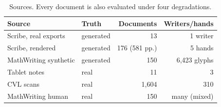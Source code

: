 \begin{table}[t]\centering\caption{Sources. Every document is also evaluated under four degradations.}\label{tab:data}
\footnotesize\setlength{\tabcolsep}{4pt}\begin{tabular}{@{}llrr@{}}\toprule
Source & Truth & Documents & Writers/hands \\\midrule
Scribe, real exports & generated & 13 & 1 writer \\
Scribe, rendered & generated & 176 (581 pp.) & 5 hands \\
MathWriting synthetic & generated & 150 & 6{,}423 glyphs \\
Tablet notes & real & 11 & 3 \\
CVL scans & real & 1{,}604 & 310 \\
MathWriting human & real & 150 & many (mixed) \\
\bottomrule\end{tabular}\end{table}
